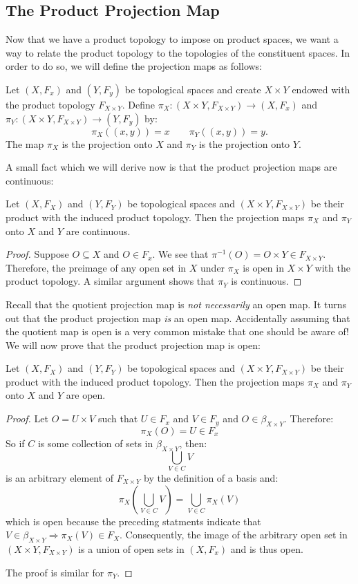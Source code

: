 \subsection{The Product Projection Map}

Now that we have a product topology to impose on product spaces, we want a way to relate the product topology to the topologies of the constituent spaces. In order to do so, we will define the projection maps as follows: 
\begin{definition}
	Let $(X,F_x)$ and $(Y,F_y)$ be topological spaces and create $X\times Y$ endowed with the product topology $F_{X\times Y}$. Define $\pi_X: (X\times Y,F_{X\times Y}) \to (X,F_x)$ and $\pi_Y:(X\times Y,F_{X\times Y}) \to (Y,F_y)$ by:
	\[\pi_X((x,y)) = x \qquad \pi_Y((x,y)) = y.\]
	The map $\pi_X$ is the projection onto $X$ and $\pi_Y$ is the projection onto $Y$. 
\end{definition}

A small fact which we will derive now is that the product projection maps are continuous: 
\begin{theorem}
	Let $(X,F_X)$ and $(Y,F_Y)$ be topological spaces and $(X\times Y,F_{X\times Y})$ be their product with the induced product topology. Then the projection maps $\pi_X$ and $\pi_Y$ onto $X$ and $Y$ are continuous. 
\end{theorem}
\begin{proof}
	Suppose $O\subseteq X$ and $O\in F_x$. We see that $\pi^{-1}(O) = O\times Y \in F_{X\times Y}$. Therefore, the preimage of any open set in $X$ under $\pi_X$ is open in $X\times Y$ with the product topology. A similar argument shows that $\pi_Y$ is continuous. 
\end{proof}

Recall that the quotient projection map is \emph{not necessarily} an open map. It turns out that the product projection map \emph{is} an open map. Accidentally assuming that the quotient map is open is a very common mistake that one should be aware of! We will now prove that the product projection map is open: 
\begin{theorem}
	Let $(X,F_X)$ and $(Y,F_Y)$ be topological spaces and $(X\times Y,F_{X\times Y})$ be their product with the induced product topology. Then the projection maps $\pi_X$ and $\pi_Y$ onto $X$ and $Y$ are open. 
\end{theorem}
\begin{proof}
	Let $O = U\times V$ such that $U \in F_x$ and $V\in F_y$ and $O\in \beta_{X\times Y}$. Therefore:
	\[\pi_X(O) = U\in F_x\]
	So if $C$ is some collection of sets in $\beta_{X\times Y}$, then:
	\[\bigcup_{V\in C}V\]
	is an arbitrary element of $F_{X\times Y}$ by the definition of a basis and:
	\[\pi_X\left( \bigcup_{V\in C}V \right) = \bigcup_{V\in C} \pi_X(V)\]
	which is open because the preceding statments indicate that $V\in \beta_{X\times Y} \Rightarrow \pi_X(V)\in F_X$. Consequently, the image of the arbitrary open set in $(X\times Y, F_{X\times Y})$ is a union of open sets in $(X,F_x)$ and is thus open.
	
	The proof is similar for $\pi_Y$. 
\end{proof}

